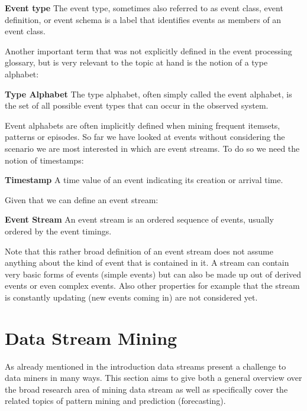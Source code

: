 \begin{mydef}
\textbf{Event type} The event type, sometimes also referred to as event class, event definition, or event schema is a label that identifies events as members of an event class.
\end{mydef}

Another important term that was not explicitly defined in the event processing glossary, but is very relevant to the topic at hand is the notion of a type alphabet:

\begin{mydef}
\textbf{Type Alphabet} The type alphabet, often simply called the event alphabet, is the set of all possible event types that can occur in the observed system.
\end{mydef}

Event alphabets are often implicitly defined when mining frequent itemsets, patterns or episodes.
So far we have looked at events without considering the scenario we are most interested in which are event streams. To do so we need the notion of timestamps:

\begin{mydef}
\textbf{Timestamp} A time value of an event indicating its creation or arrival time.
\end{mydef}

Given that we can define an event stream:

\begin{mydef}
\textbf{Event Stream} An event stream is an ordered sequence of events, usually ordered by the event timings.
\end{mydef}

Note that this rather broad definition of an event stream does not assume anything about the kind of event that is contained in it. A stream can contain very basic forms of events (simple events) but can also be made up out of derived events or even complex events. Also other properties for example that the stream is constantly updating (new events coming in) are not considered yet.


\section{Data Stream Mining}
\label{sec_streamMining}
As already mentioned in the introduction data streams present a challenge to data miners in many ways. This section aims to give both a general overview over the broad research area of mining data stream as well as specifically cover the related topics of pattern mining and prediction (forecasting). \\

